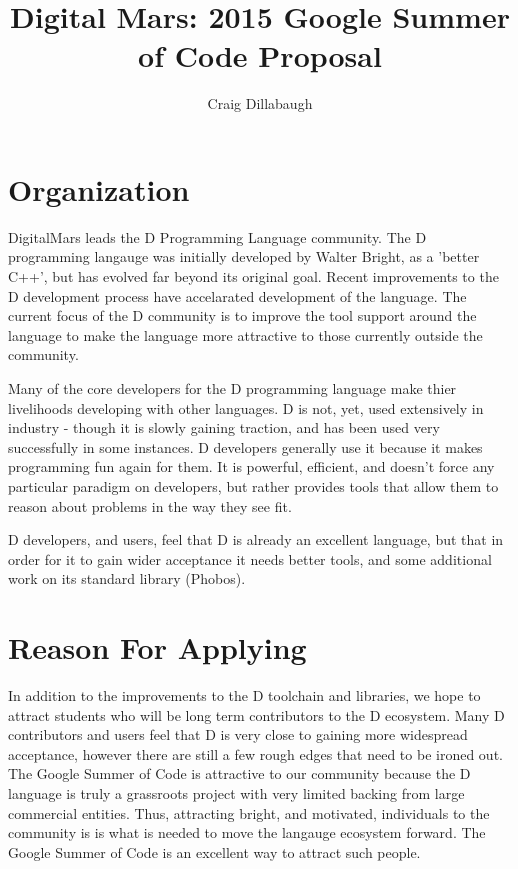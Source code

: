 \documentclass[a4paper,12pt]{article}
\title{Digital Mars: 2015 Google Summer of Code Proposal}
\author{Craig Dillabaugh}
\begin{document}
\maketitle

\section{Organization}

DigitalMars leads the D Programming Language community.   The D programming
langauge was initially developed by Walter Bright, as a 'better C++', but
has evolved far beyond its original goal.
Recent improvements to 
the D development process have accelarated development of the language. The 
current focus of the D community is to improve the tool support around the 
language to make the language more attractive to those currently outside the 
community.  

Many of the core developers for the D programming language make thier 
livelihoods developing with other languages.  D is not, yet, used extensively
in industry - though it is slowly gaining traction, and has been used very 
successfully in some instances.
D developers generally use it because it makes programming fun again for them.  
It is 
powerful, efficient, and doesn't force any particular paradigm on developers,
but rather provides tools that allow them to reason about problems in the way 
they see fit. 

D developers, and users, feel that D is already an excellent language, but 
that in order
for it to gain wider acceptance it needs better tools, and some additional 
work on its standard library (Phobos).  


\section{Reason For Applying}

In addition to the improvements to the D toolchain and libraries, we 
hope to attract students who will be long term contributors to the D ecosystem.
Many D contributors and users feel that D is very close to gaining more
widespread acceptance, however there are still a few rough edges that
need to be ironed out. 
The Google Summer of Code is attractive to our community because the D 
language is truly a grassroots project with very limited backing from 
large commercial entities.  
Thus, attracting bright, and motivated, individuals to the community is
is what is needed to move the langauge ecosystem forward.
The Google Summer of Code is an excellent way to attract such people.
\end{document}
